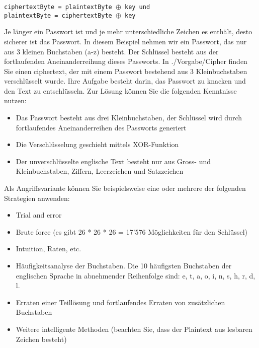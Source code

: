 \noindent
\texttt{ciphertextByte = plaintextByte $\oplus$ key und \\
plaintextByte = ciphertextByte $\oplus$ key}


Je länger ein Passwort ist und je mehr unterschiedliche Zeichen es enthält, desto sicherer ist das Passwort. In diesem Beispiel nehmen wir ein Passwort, das nur aus 3 kleinen Buchstaben (a-z) besteht. Der Schlüssel besteht aus der fortlaufenden Aneinanderreihung dieses Passworts.
In ./Vorgabe/Cipher finden Sie einen ciphertext, der mit einem Passwort bestehend aus 3 Kleinbuchstaben verschlüsselt wurde. Ihre Aufgabe besteht darin, das Passwort zu knacken und den Text zu entschlüsseln. Zur Lösung können Sie die folgenden Kenntnisse nutzen:
\begin{itemize}
  \item Das Passwort besteht aus drei Kleinbuchstaben, der Schlüssel wird durch fortlaufendes Aneinanderreihen des Passworts generiert
  \item Die Verschlüsselung geschieht mittels XOR-Funktion
  \item Der unverschlüsselte englische Text besteht nur aus Gross- und Kleinbuchstaben, Ziffern, Leerzeichen und Satzzeichen
\end{itemize}

Als Angriffsvariante können Sie beispielsweise eine oder mehrere der folgenden Strategien anwenden:
\begin{itemize}
  \item Trial and error
  \item Brute force (es gibt 26 * 26 * 26 = 17'576 Möglichkeiten für den Schlüssel)
  \item Intuition, Raten, etc.
  \item Häufigkeitsanalyse der Buchstaben. Die 10 häufigsten Buchstaben der englischen Sprache in abnehmender Reihenfolge sind: e, t, a, o, i, n, s, h, r, d, l.
  \item Erraten einer Teillösung und fortlaufendes Erraten von zusätzlichen Buchstaben
  \item Weitere intelligente Methoden (beachten Sie, dass der Plaintext aus lesbaren Zeichen besteht)
\end{itemize}

